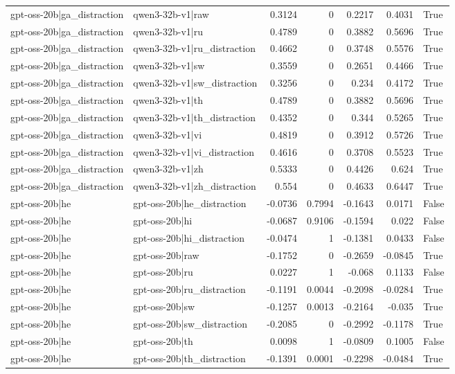 \begin{table}
\begin{tabular}{l l r r r r l}
gpt-oss-20b|ga_distraction & qwen3-32b-v1|raw & 0.3124 & 0 & 0.2217 & 0.4031 & True \\
gpt-oss-20b|ga_distraction & qwen3-32b-v1|ru & 0.4789 & 0 & 0.3882 & 0.5696 & True \\
gpt-oss-20b|ga_distraction & qwen3-32b-v1|ru_distraction & 0.4662 & 0 & 0.3748 & 0.5576 & True \\
gpt-oss-20b|ga_distraction & qwen3-32b-v1|sw & 0.3559 & 0 & 0.2651 & 0.4466 & True \\
gpt-oss-20b|ga_distraction & qwen3-32b-v1|sw_distraction & 0.3256 & 0 & 0.234 & 0.4172 & True \\
gpt-oss-20b|ga_distraction & qwen3-32b-v1|th & 0.4789 & 0 & 0.3882 & 0.5696 & True \\
gpt-oss-20b|ga_distraction & qwen3-32b-v1|th_distraction & 0.4352 & 0 & 0.344 & 0.5265 & True \\
gpt-oss-20b|ga_distraction & qwen3-32b-v1|vi & 0.4819 & 0 & 0.3912 & 0.5726 & True \\
gpt-oss-20b|ga_distraction & qwen3-32b-v1|vi_distraction & 0.4616 & 0 & 0.3708 & 0.5523 & True \\
gpt-oss-20b|ga_distraction & qwen3-32b-v1|zh & 0.5333 & 0 & 0.4426 & 0.624 & True \\
gpt-oss-20b|ga_distraction & qwen3-32b-v1|zh_distraction & 0.554 & 0 & 0.4633 & 0.6447 & True \\
gpt-oss-20b|he & gpt-oss-20b|he_distraction & -0.0736 & 0.7994 & -0.1643 & 0.0171 & False \\
gpt-oss-20b|he & gpt-oss-20b|hi & -0.0687 & 0.9106 & -0.1594 & 0.022 & False \\
gpt-oss-20b|he & gpt-oss-20b|hi_distraction & -0.0474 & 1 & -0.1381 & 0.0433 & False \\
gpt-oss-20b|he & gpt-oss-20b|raw & -0.1752 & 0 & -0.2659 & -0.0845 & True \\
gpt-oss-20b|he & gpt-oss-20b|ru & 0.0227 & 1 & -0.068 & 0.1133 & False \\
gpt-oss-20b|he & gpt-oss-20b|ru_distraction & -0.1191 & 0.0044 & -0.2098 & -0.0284 & True \\
gpt-oss-20b|he & gpt-oss-20b|sw & -0.1257 & 0.0013 & -0.2164 & -0.035 & True \\
gpt-oss-20b|he & gpt-oss-20b|sw_distraction & -0.2085 & 0 & -0.2992 & -0.1178 & True \\
gpt-oss-20b|he & gpt-oss-20b|th & 0.0098 & 1 & -0.0809 & 0.1005 & False \\
gpt-oss-20b|he & gpt-oss-20b|th_distraction & -0.1391 & 0.0001 & -0.2298 & -0.0484 & True \\

\end{tabular}
\end{table}
